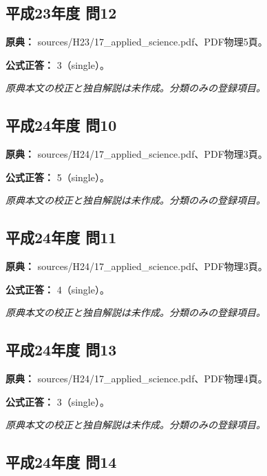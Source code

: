 \subsection{平成23年度 問12}
\label{q:h23-reg-applied-12}

\noindent\textbf{原典：} sources/H23/17\_applied\_science.pdf、PDF物理5頁。

\textbf{公式正答：} 3（single）。

\par\textit{原典本文の校正と独自解説は未作成。分類のみの登録項目。}

\subsection{平成24年度 問10}
\label{q:h24-reg-applied-10}

\noindent\textbf{原典：} sources/H24/17\_applied\_science.pdf、PDF物理3頁。

\textbf{公式正答：} 5（single）。

\par\textit{原典本文の校正と独自解説は未作成。分類のみの登録項目。}

\subsection{平成24年度 問11}
\label{q:h24-reg-applied-11}

\noindent\textbf{原典：} sources/H24/17\_applied\_science.pdf、PDF物理3頁。

\textbf{公式正答：} 4（single）。

\par\textit{原典本文の校正と独自解説は未作成。分類のみの登録項目。}

\subsection{平成24年度 問13}
\label{q:h24-reg-applied-13}

\noindent\textbf{原典：} sources/H24/17\_applied\_science.pdf、PDF物理4頁。

\textbf{公式正答：} 3（single）。

\par\textit{原典本文の校正と独自解説は未作成。分類のみの登録項目。}

\subsection{平成24年度 問14}
\label{q:h24-reg-applied-14}

